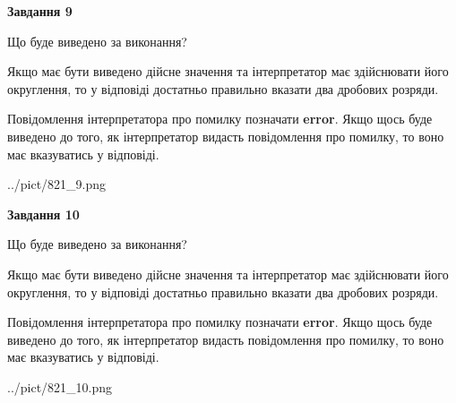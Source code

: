 \documentclass[12pt, ukrainian]{article}
\begin{document}
{\begin {Large}
{\begin {center}\textbf{Завдання 9}\end {center}}\par
Що буде виведено за виконання? \par

Якщо має бути виведено дійсне значення та інтерпретатор має здійснювати його округлення, 
то у відповіді достатньо правильно вказати два дробових розряди.

Повідомлення інтерпретатора про помилку позначати \textbf{error}.
Якщо щось буде виведено до того, як інтерпретатор видасть повідомлення про помилку, 
то воно має вказуватись у відповіді. \par

\begin{center}
	{../pict/821_9.png}
\end{center}
\newpage

{\begin {center}\textbf{Завдання 10}\end {center}}\par
Що буде виведено за виконання? \par

Якщо має бути виведено дійсне значення та інтерпретатор має здійснювати його округлення, 
то у відповіді достатньо правильно вказати два дробових розряди.

Повідомлення інтерпретатора про помилку позначати \textbf{error}.
Якщо щось буде виведено до того, як інтерпретатор видасть повідомлення про помилку, 
то воно має вказуватись у відповіді. \par

\begin{center}
	{../pict/821_10.png}
\end{center}
\newpage

\end {Large}}
\end{document}
